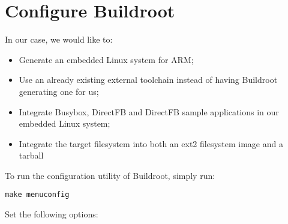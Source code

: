 \section{Configure Buildroot}

In our case, we would like to:

\begin{itemize}
\item Generate an embedded Linux system for ARM;
\item Use an already existing external toolchain instead of having
  Buildroot generating one for us;
\item Integrate Busybox, DirectFB and DirectFB sample applications in
  our embedded Linux system;
\item Integrate the target filesystem into both an ext2 filesystem
  image and a tarball
\end{itemize}

To run the configuration utility of Buildroot, simply run:

\begin{verbatim}
make menuconfig
\end{verbatim}

Set the following options:


